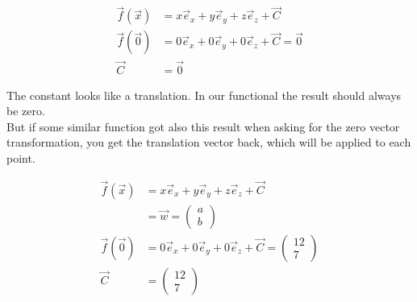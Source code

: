 \documentclass[a4paper]{article}
\begin{document}
\begin{Example}
\begin{displaymath}
\begin{align}
\vec{f}(\vec{x}) &= x\vec{e}_{x} + y\vec{e}_{y} + z\vec{e}_{z} + \vec{C}\\
\vec{f}(\vec{0}) &= 0\vec{e}_{x} + 0\vec{e}_{y} + 0\vec{e}_{z} + \vec{C} = \vec{0}\\
\vec{C} &= \vec{0}
\end{align}
\end{displaymath}



The constant looks like a translation. In our functional the result should always be zero.\\

But if some similar function got also this result when asking for the zero vector transformation, you get the translation vector back, which will be applied to each point.


\begin{displaymath}
\begin{align}
\vec{f}(\vec{x}) &= x\vec{e}_{x} + y\vec{e}_{y} + z\vec{e}_{z} + \vec{C}\\ &= \vec{w} = \begin{pmatrix}a\\b\end{pmatrix}\\
\vec{f}(\vec{0}) &= 0\vec{e}_{x} + 0\vec{e}_{y} + 0\vec{e}_{z} + \vec{C} = \begin{pmatrix}12\\7\end{pmatrix}\\
\vec{C} &= \begin{pmatrix}12\\7\end{pmatrix}\\
\end{align}
\end{displaymath}


\end{Example}
\end{document}
